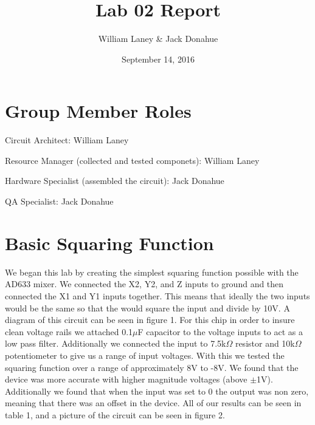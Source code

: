 \documentclass[prl,12pt,notitlepage,aps,onecolumn,superscriptaddress]{revtex4-1}
\newcommand{\ohm}{$\Omega$ }
\begin{document}
\title{Lab 02 Report}
\author{William Laney \& Jack  Donahue}
\date{September 14, 2016}
\maketitle

\section{Group Member Roles}

Circuit Architect: William Laney

Resource Manager (collected and tested componets):  William Laney

Hardware Specialist (assembled the circuit): Jack  Donahue

QA Specialist: Jack  Donahue

\section{Basic Squaring Function}
We began this lab by creating the simplest squaring function possible with the AD633 mixer. We connected the X2, Y2, and Z inputs to ground and then connected the X1 and Y1 inputs together. This means that ideally the two inputs would be the same so that the would square the input and divide by 10V. A diagram of this circuit can be seen in figure 1. For this chip in order to insure clean voltage rails we attached 0.1$\mu$F capacitor to the voltage inputs to act as a low pass filter. Additionally we connected the input to 7.5k\ohm resistor and 10k\ohm potentiometer to give us a range of input voltages. With this we tested the squaring function over a range of approximately 8V to -8V. We found that the device was more accurate with higher magnitude voltages (above $\pm$1V). Additionally we found that when the input was set to 0 the output was non zero, meaning that there was an offset in the device. All of our results can be seen in table 1, and a picture of the circuit can be seen in figure 2.
\end{document}
